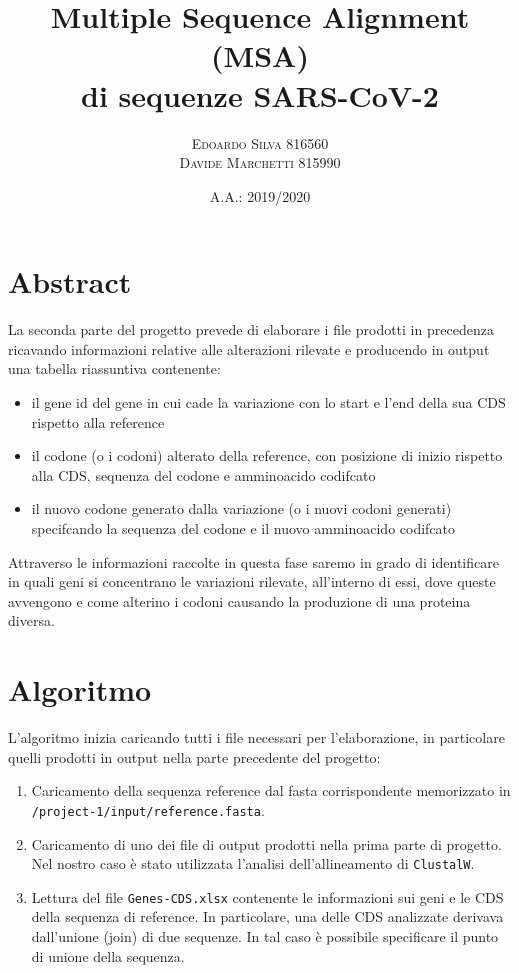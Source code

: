 \documentclass[11pt,italian]{article}
\title{Multiple Sequence Alignment (MSA) \\ di sequenze SARS-CoV-2}
\date{A.A.: 2019/2020}
\author{
    \textsc{Edoardo Silva} 816560 \\
    \textsc{Davide Marchetti} 815990
}
\begin{document}
\maketitle

\section{Abstract}
La seconda parte del progetto prevede di elaborare i file prodotti in precedenza ricavando informazioni relative alle alterazioni rilevate e producendo in output una tabella riassuntiva contenente:
\begin{itemize}
  \item il gene id del gene in cui cade la variazione con lo start e l'end della sua CDS rispetto alla reference
  \item il codone (o i codoni) alterato della reference, con posizione di inizio rispetto alla CDS, sequenza del codone e amminoacido codifcato
  \item il nuovo codone generato dalla variazione (o i nuovi codoni generati) specifcando la sequenza del codone e il nuovo amminoacido codifcato
\end{itemize}
Attraverso le informazioni raccolte in questa fase saremo in grado di identificare in quali geni si concentrano le variazioni rilevate, all'interno di essi, dove queste avvengono e come alterino i codoni causando la produzione di una proteina diversa.

\newpage
\section{Algoritmo}
L'algoritmo inizia caricando tutti i file necessari per l'elaborazione, in particolare quelli prodotti in output nella parte precedente del progetto:
\begin{enumerate}
  \item Caricamento della sequenza reference dal fasta corrispondente memorizzato in \lstinline{/project-1/input/reference.fasta}.
  \item Caricamento di uno dei file di output prodotti nella prima parte di progetto. Nel nostro caso è stato utilizzata l'analisi dell'allineamento di \lstinline{ClustalW}.
  \item Lettura del file \lstinline{Genes-CDS.xlsx} contenente le informazioni sui geni e le CDS della sequenza di reference. In particolare, una delle CDS analizzate derivava dall'unione (join) di due sequenze. In tal caso è possibile specificare il punto di unione della sequenza.
\end{enumerate}
\end{document}
